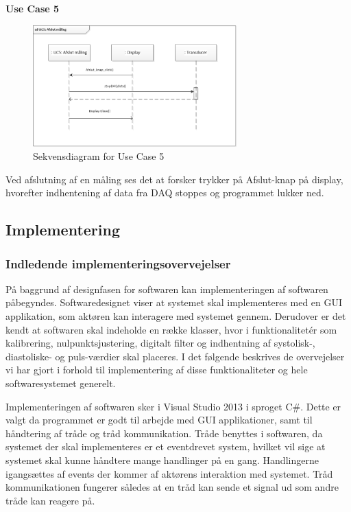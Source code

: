 \textbf{Use Case 5}
\begin{figure}[H]
	\centering
	\includegraphics[width=0.7\textwidth]{Figurer/UC5}
	\caption{Sekvensdiagram for Use Case 5}
\end{figure}
Ved afslutning af en måling ses det at forsker trykker på Afslut-knap på display, hvorefter indhentening af data fra DAQ stoppes og programmet lukker ned.

\subsection{Implementering}
\subsubsection{Indledende implementeringsovervejelser}
På baggrund af designfasen for softwaren kan implementeringen af softwaren påbegyndes. Softwaredesignet viser at systemet skal implementeres med en GUI applikation, som aktøren kan interagere med systemet gennem. Derudover er det kendt at softwaren skal indeholde en række klasser, hvor i funktionalitetér som kalibrering, nulpunktsjustering, digitalt filter og indhentning af systolisk-, diastoliske- og puls-værdier skal placeres. I det følgende beskrives de overvejelser vi har gjort i forhold til implementering af disse funktionaliteter og hele softwaresystemet generelt. 

Implementeringen af softwaren sker i Visual Studio 2013 i sproget C\#. Dette er valgt da programmet er godt til arbejde med GUI applikationer, samt til håndtering af tråde og tråd kommunikation. Tråde benyttes i softwaren, da systemet der skal implementeres er et eventdrevet system, hvilket vil sige at systemet skal kunne håndtere mange handlinger på en gang. Handlingerne igangsættes af events der kommer af aktørens interaktion med systemet. Tråd kommunikationen fungerer således at en tråd kan sende et signal ud som andre tråde kan reagere på. 

